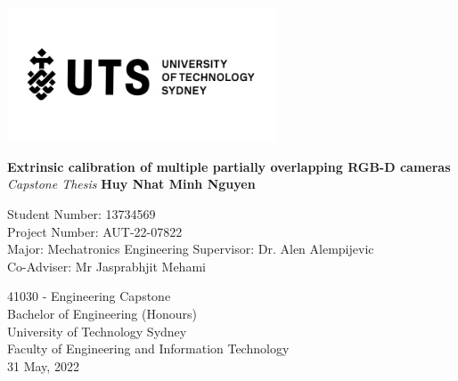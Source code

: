 \documentclass[a4paper, 12pt, oneside]{report}
\begin{document}




\thispagestyle{fancy}
\begin{flushright}
\includegraphics[width=8cm]{Images/uts_logo_complete.jpg}
\end{flushright}	
\vskip20mm
\begin{center}
\LARGE\textbf{Extrinsic calibration of multiple partially overlapping RGB-D cameras}
\vskip5mm
\large\textit{Capstone Thesis}
\vskip2mm
\normalsize\textbf{Huy Nhat Minh Nguyen}

\vspace{20mm}
\normalsize
Student Number: 13734569 \\
Project Number: AUT-22-07822 \\
Major: Mechatronics Engineering
\vskip5mm
Supervisor: Dr. Alen Alempijevic \\
Co-Adviser: Mr Jasprabhjit Mehami \\
\end{center}
\vfill
\begin{center}
\normalsize
41030 - Engineering Capstone \\
Bachelor of Engineering (Honours) \\
University of Technology Sydney	\\
Faculty of Engineering and Information Technology\\
31 May, 2022
\end{center}




\end{document}
